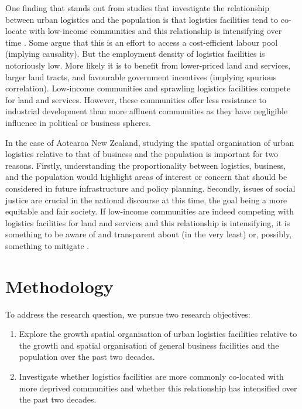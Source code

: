 \documentclass[3p, a4paper, authoryear, 11pt, fleqn, review]{elsarticle}
\newcommand{\nmt}[1]{{\color{ForestGreen}{~(nmt: #1)}}}
\begin{document}
One finding that stands out from studies that investigate the relationship between urban logistics and the population is that logistics facilities tend to co-locate with low-income communities and this relationship is intensifying over time \citep{Jaller_etal2017, Strale2020}. Some argue that this is an effort to access a cost-efficient labour pool (implying causality). But the employment density of logistics facilities is notoriously low. More likely it is to benefit from lower-priced land and services, larger land tracts, and favourable government incentives (implying spurious correlation). Low-income communities and sprawling logistics facilities compete for land and services. However, these communities offer less resistance to industrial development than more affluent communities as they have negligible influence in political or business spheres. 

In the case of Aotearoa New Zealand, studying the spatial organisation of urban logistics relative to that of business and the population is important for two reasons. Firstly, understanding the proportionality between logistics, business, and the population would highlight areas of interest or concern that should be considered in future infrastructure and policy planning. Secondly, issues of social justice are crucial in the national discourse at this time, the goal being a more equitable and fair society. If low-income communities are indeed competing with logistics facilities for land and services and this relationship is intensifying, it is something to be aware of and transparent about (in the very least) or, possibly, something to mitigate \nmt{mediate?}.

\nmt{linking sentence?}

\section{Methodology}
\label{sec:Method}

To address the research question, we pursue two research objectives:
\begin{enumerate}
\item Explore the growth spatial organisation of urban logistics facilities relative to the growth and spatial organisation of general business facilities and the population over the past two decades.
\item Investigate whether logistics facilities are more commonly co-located with more deprived communities and whether this relationship has intensified over the past two decades. 	
\end{enumerate}
\end{document}
